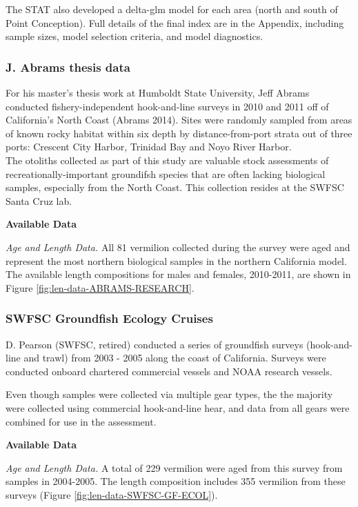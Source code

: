 \documentclass[
  english,
  a4paper,
]{article}
\begin{document}
The STAT also developed
a delta-glm model for each area (north and south of Point Conception). Full details
of the final index are in the Appendix, including
sample sizes, model selection criteria, and model diagnostics.

\hypertarget{j.-abrams-thesis-data}{%
\subsubsection{J. Abrams thesis data}\label{j.-abrams-thesis-data}}

For his master's thesis work at Humboldt State University, Jeff Abrams conducted
fishery-independent hook-and-line surveys in 2010 and 2011 off of California's
North Coast (Abrams 2014). Sites were randomly sampled from
areas of known rocky habitat within six depth by distance-from-port strata out
of three ports: Crescent City Harbor, Trinidad Bay and Noyo River Harbor.\\
The otoliths collected as part of this study are valuable stock assessments of
recreationally-important groundifsh species that are often lacking biological samples,
especially from the North Coast. This collection resides at the SWFSC Santa Cruz lab.

\textbf{Available Data}

\emph{Age and Length Data.}
All 81 vermilion collected during the survey were aged and represent the most
northern biological samples in the northern California model. The available
length compositions for males and females, 2010-2011, are shown in Figure
\ref{fig:len-data-ABRAMS-RESEARCH}.

\hypertarget{swfsc-groundfish-ecology-cruises}{%
\subsubsection{SWFSC Groundfish Ecology Cruises}\label{swfsc-groundfish-ecology-cruises}}

D. Pearson (SWFSC, retired) conducted a series of groundfish surveys (hook-and-line and
trawl) from 2003 - 2005 along the coast of California. Surveys were conducted onboard
chartered commercial vessels and NOAA research vessels.

Even though samples were collected via multiple gear types, the the majority
were collected using commercial hook-and-line hear, and data from all gears
were combined for use in the assessment.

\textbf{Available Data}

\emph{Age and Length Data.}
A total of 229 vermilion were aged from this survey from samples in 2004-2005.
The length composition includes 355 vermilion from these surveys
(Figure \ref{fig:len-data-SWFSC-GF-ECOL}).
\end{document}
